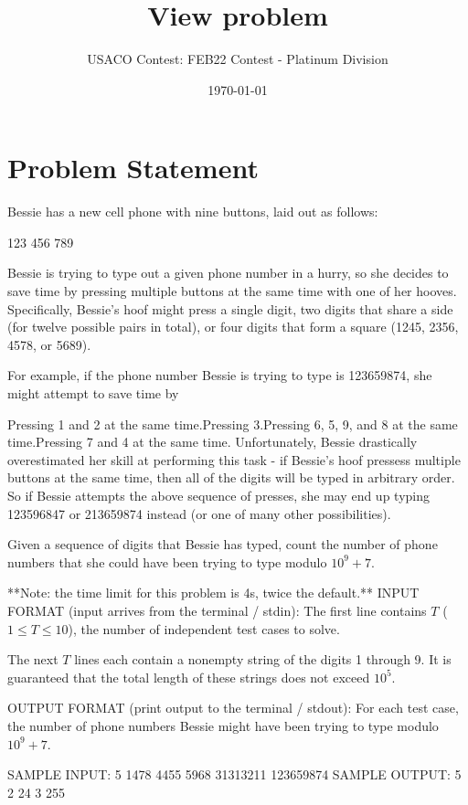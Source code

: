 \documentclass[12pt]{article}
\title{View problem}
\author{USACO Contest: FEB22 Contest - Platinum Division}
\date{\today}
\begin{document}
\maketitle

\section*{Problem Statement}

Bessie has a new cell phone with nine buttons, laid out as follows:


123
456
789

Bessie is trying to type out a given phone number in a hurry, so she decides to
save time by pressing multiple buttons at the same time with one of her hooves.
Specifically, Bessie's hoof might press a single digit, two digits that share a
side (for twelve possible pairs in total), or four digits that form a square 
(1245, 2356, 4578, or 5689). 

For example, if the phone number Bessie is trying to type is 123659874, she
might attempt to save time by

Pressing 1 and 2 at the same time.Pressing 3.Pressing 6, 5, 9, and 8 at the same time.Pressing 7 and 4 at the same time.
Unfortunately, Bessie drastically overestimated her skill at performing this
task - if Bessie's hoof pressess multiple buttons at the same time, then  all of
the digits will be typed in arbitrary order. So if Bessie attempts the above
sequence of presses, she may end up typing 123596847 or 213659874 instead (or
one of many other possibilities).

Given a sequence of digits that Bessie has typed, count the number of phone
numbers that she could have been trying to type modulo $10^9+7$.

**Note: the time limit for this problem is 4s, twice the default.**
INPUT FORMAT (input arrives from the terminal / stdin):
The first line contains $T$ ($1\le T\le 10$), the number of independent test
cases to solve.

The next $T$ lines each contain a nonempty string of the digits 1 through 9. It
is guaranteed that the total length of these strings does not exceed $10^5$.

OUTPUT FORMAT (print output to the terminal / stdout):
For each test case, the number of phone numbers Bessie might have been trying to
type modulo $10^9+7$.

SAMPLE INPUT:
5
1478
4455
5968
31313211
123659874
SAMPLE OUTPUT: 
5
2
24
3
255
\end{document}
